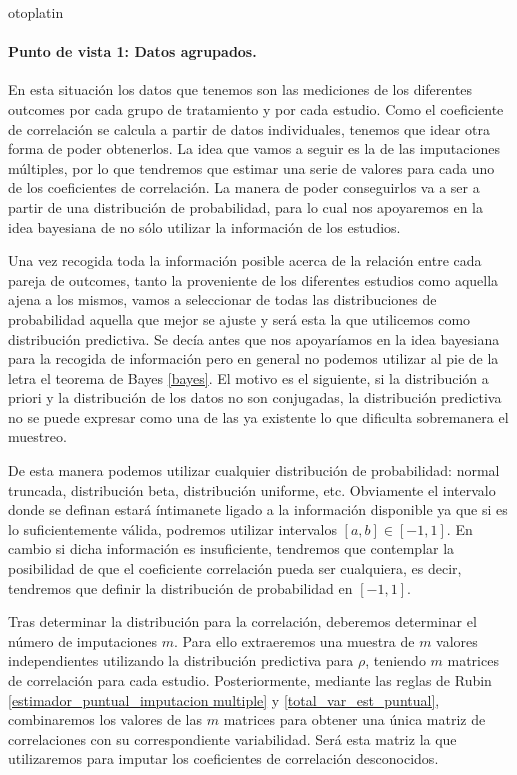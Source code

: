 otoplatin\documentclass[a4paper,openright,12pt]{report}
\begin{document}
\paragraph{Punto de vista 1: Datos agrupados.} 
En esta situación los datos que tenemos son las mediciones de los diferentes outcomes por cada grupo de tratamiento y por cada estudio. Como el coeficiente de correlación se calcula a partir de datos individuales, tenemos que idear otra forma de poder obtenerlos. La idea que vamos a seguir es la de las imputaciones múltiples, por lo que tendremos que estimar una serie de valores para cada uno de los coeficientes de correlación. La manera de poder conseguirlos va a ser a partir de una distribución de probabilidad, para lo cual nos apoyaremos en la idea bayesiana de no sólo utilizar la información de los estudios.

Una vez recogida toda la información posible acerca de la relación entre cada pareja de outcomes, tanto la proveniente de los diferentes estudios como aquella ajena a los mismos, vamos a seleccionar de todas las distribuciones de probabilidad aquella que mejor se ajuste y será esta la que utilicemos como distribución predictiva. Se decía antes que nos apoyaríamos en la idea bayesiana para la recogida de información pero en general no podemos utilizar al pie de la letra el teorema de Bayes \ref{bayes}. El motivo es el siguiente, si la distribución a priori y la distribución de los datos no son conjugadas, la distribución predictiva no se puede expresar como una de las ya existente lo que dificulta sobremanera el muestreo.

De esta manera podemos utilizar cualquier distribución de probabilidad: normal truncada, distribución beta, distribución uniforme, etc. Obviamente el intervalo donde se definan estará íntimanete ligado a la información disponible ya que si es lo suficientemente válida, podremos utilizar intervalos $[a,b]\in [-1,1]$. En cambio si dicha información es insuficiente, tendremos que contemplar la posibilidad de que el coeficiente correlación pueda ser cualquiera, es decir, tendremos que definir la distribución de probabilidad en $[-1,1]$.

Tras determinar la distribución para la correlación, deberemos determinar el número de imputaciones $m$. Para ello extraeremos una muestra de $m$ valores independientes utilizando la distribución predictiva para $\rho$, teniendo $m$ matrices de correlación para cada estudio. Posteriormente, mediante las reglas de Rubin \ref{estimador_puntual_imputacion multiple} y \ref{total_var_est_puntual}, combinaremos los valores de las $m$ matrices para obtener una única matriz de correlaciones con su correspondiente variabilidad. Será esta matriz la que utilizaremos para imputar los coeficientes de correlación desconocidos. 
\end{document}
